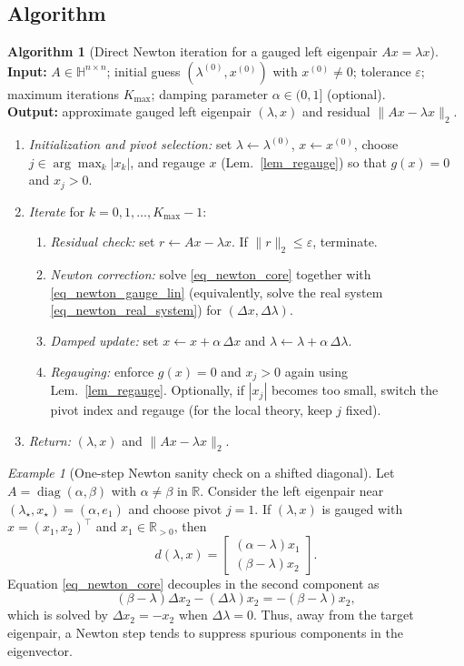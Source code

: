 \documentclass[preprint,12pt]{elsarticle}  %
\theoremstyle{definition}
\theoremstyle{definition}
\theoremstyle{definition}
\theoremstyle{definition}
\newtheorem{Alg}{Algorithm}
\theoremstyle{definition}
\theoremstyle{remark}
\theoremstyle{remark}
\newtheorem{Ex}{Example}
\theoremstyle{remark}
\newcommand{\RR}{\mathbb{R}}
\newcommand{\HH}{\mathbb{H}}
\DeclareMathOperator{\diag}{diag}
\begin{document}
\subsection{Algorithm}
\label{subsec_newton_algorithm}
\begin{Alg}[Direct Newton iteration for a gauged left eigenpair $Ax=\lambda x$]
\label{alg_newton_left_eig}
\noindent\textbf{Input:} $A\in\HH^{n\times n}$; initial guess $(\lambda^{(0)},x^{(0)})$ with $x^{(0)}\neq 0$;
tolerance $\varepsilon$; maximum iterations $K_{\max}$; damping parameter $\alpha\in(0,1]$ (optional).\\
\textbf{Output:} approximate gauged left eigenpair $(\lambda,x)$ and residual $\|Ax-\lambda x\|_2$.
\begin{enumerate}
\item \emph{Initialization and pivot selection:}
set $\lambda\gets \lambda^{(0)}$, $x\gets x^{(0)}$, choose
$j\in\arg\max_k |x_k|$, and regauge $x$ (Lem.~\ref{lem_regauge}) so that $g(x)=0$ and $x_j>0$.
\item \emph{Iterate} for $k=0,1,\dots,K_{\max}-1$:
\begin{enumerate}
\item \emph{Residual check:} set $r\gets Ax-\lambda x$. If $\|r\|_2\le \varepsilon$, terminate.
\item \emph{Newton correction:} solve \eqref{eq_newton_core} together with \eqref{eq_newton_gauge_lin}
(equivalently, solve the real system \eqref{eq_newton_real_system}) for $(\Delta x,\Delta\lambda)$.
\item \emph{Damped update:} set $x\gets x+\alpha\,\Delta x$ and $\lambda\gets \lambda+\alpha\,\Delta\lambda$.
\item \emph{Regauging:} enforce $g(x)=0$ and $x_j>0$ again using Lem.~\ref{lem_regauge}.
Optionally, if $|x_j|$ becomes too small, switch the pivot index and regauge
(for the local theory, keep $j$ fixed).
\end{enumerate}
\item \emph{Return:} $(\lambda,x)$ and $\|Ax-\lambda x\|_2$.
\end{enumerate}
\end{Alg}

\begin{Ex}[One-step Newton sanity check on a shifted diagonal]
\label{ex_newton_shifted_diag}
Let $A=\diag(\alpha,\beta)$ with $\alpha\neq\beta$ in $\RR$. Consider the left eigenpair near
$(\lambda_\star,x_\star)=(\alpha,e_1)$ and choose pivot $j=1$.
If $(\lambda,x)$ is gauged with $x=(x_1,x_2)^\top$ and $x_1\in\RR_{>0}$, then
\[
d(\lambda,x)=\begin{bmatrix}(\alpha-\lambda)x_1\\ (\beta-\lambda)x_2\end{bmatrix}.
\]
Equation \eqref{eq_newton_core} decouples in the second component as
\[
(\beta-\lambda)\Delta x_2-(\Delta\lambda)x_2=-(\beta-\lambda)x_2,
\]
which is solved by $\Delta x_2=-x_2$ when $\Delta\lambda=0$.
Thus, away from the target eigenpair, a Newton step tends to suppress spurious components in the eigenvector.
\end{Ex}
\end{document}
